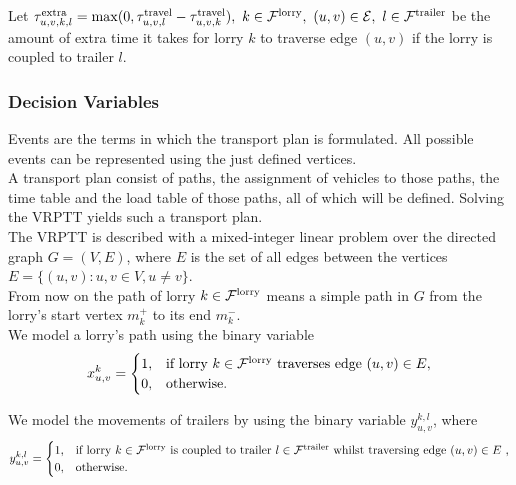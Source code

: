 Let
$
  \tau^{\rm extra }_{u,v,k,l} =
  \max(0, \tau_{u,v,l}^{\rm travel} - \tau_{u,v,k}^{\rm travel} ),
\ k \in \mathcal{F}^{\rm lorry},
\ (u,v) \in \mathcal E,
\  l \in \mathcal{F}^{\rm trailer}$
be the amount of extra time it takes for lorry
$k $
to traverse edge
$(u,v)$
if the lorry is coupled to trailer
$l $. \\





\subsubsection{Decision Variables}


Events are the terms in which the transport plan is formulated.
All possible events can be represented using the just defined vertices. \\

A transport plan consist of paths, the assignment of vehicles to those paths, the time table and the load table of those paths, all of which will be defined.
Solving the VRPTT yields such a transport plan.\\

The VRPTT is described with a mixed-integer linear problem over the directed graph
$G=(V,E)$,
where $E$ is the set of all  
edges between the vertices
$ E = \{ (u,v): u,v \in V , u \neq v \} $. \\

From now on the path
of lorry
$k \in \mathcal F^{\rm lorry}$
means a simple path in $G$ from the lorry's start vertex $m^+_k$ to its end $m^-_k$. \\

We model a lorry's path using the binary variable
\begin{align}
  x^{k}_{u,v} =  \begin{cases}
  1 ,& \text{if lorry $k \in \mathcal F^{\rm lorry}$ traverses edge $(u,v) \in  E$}, \\
  0,              & \text{otherwise. }
  \end{cases}
\end{align}



We model the movements of trailers by using the binary variable
$y^{k,l}_{u,v} $, where
\begin{align}
  y^{k,l}_{u,v} =  \begin{cases}
  1 ,& \text{if lorry $k \in \mathcal F^{\rm lorry}$ is coupled to trailer $l \in \mathcal F^{\rm trailer} $ whilst traversing edge $(u,v) \in E$ }, \\
  0,              & \text{otherwise. }
  \end{cases}
\end{align}

